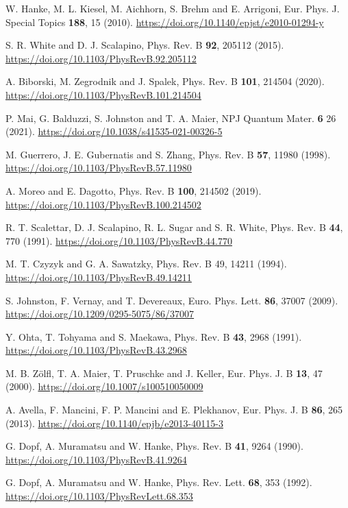 \documentclass[reprint,nofootinbib,nobibnotes,amsmath,amssymb,aps,prb,floatfix]{revtex4-1}
\begin{document}
\begin{thebibliography}{99}
 W. Hanke, M. L. Kiesel, M. Aichhorn, S. Brehm and E. Arrigoni, Eur. Phys. J. Special Topics {\bf 188}, 15 (2010). \url{https://doi.org/10.1140/epjst/e2010-01294-y}

S. R. White and D. J. Scalapino, Phys. Rev. B {\bf 92}, 205112 (2015).  \url{https://doi.org/10.1103/PhysRevB.92.205112}

 A. Biborski, M. Zegrodnik and J. Spalek, Phys. Rev. B {\bf 101}, 214504 (2020). \url{https://doi.org/10.1103/PhysRevB.101.214504}

 P. Mai, G. Balduzzi, S. Johnston and T. A. Maier, NPJ Quantum Mater. {\bf 6} 26 (2021). \url{https://doi.org/10.1038/s41535-021-00326-5}

 M. Guerrero, J. E. Gubernatis and S. Zhang, Phys. Rev. B {\bf 57}, 11980 (1998). \url{https://doi.org/10.1103/PhysRevB.57.11980}

  A. Moreo and E. Dagotto, Phys. Rev. B {\bf 100}, 214502 (2019). \url{https://doi.org/10.1103/PhysRevB.100.214502}

 R. T. Scalettar, D. J. Scalapino, R. L. Sugar and S. R. White, Phys. Rev. B {\bf 44}, 770 (1991). \url{https://doi.org/10.1103/PhysRevB.44.770}

 M. T. Czyzyk and G. A. Sawatzky, Phys. Rev. B 49, 14211 (1994). \url{https://doi.org/10.1103/PhysRevB.49.14211}

 S. Johnston, F. Vernay, and T. Devereaux, Euro. Phys. Lett. {\bf 86}, 37007 (2009). \url{https://doi.org/10.1209/0295-5075/86/37007}

 Y. Ohta, T. Tohyama and S. Maekawa,  Phys. Rev. B {\bf 43}, 2968 (1991). \url{https://doi.org/10.1103/PhysRevB.43.2968}

 M. B. Z\"{o}lfl, T. A. Maier, T. Pruschke and J. Keller, Eur. Phys. J. B {\bf 13}, 47 (2000). \url{https://doi.org/10.1007/s100510050009}

 A. Avella, F. Mancini, F. P. Mancini and E. Plekhanov, Eur. Phys. J. B {\bf 86}, 265 (2013). \url{https://doi.org/10.1140/epjb/e2013-40115-3}

 G. Dopf, A. Muramatsu and W. Hanke, Phys. Rev. B {\bf 41}, 9264 (1990). \url{https://doi.org/10.1103/PhysRevB.41.9264}

 G. Dopf, A. Muramatsu and W. Hanke, Phys. Rev. Lett. {\bf 68}, 353 (1992). \url{https://doi.org/10.1103/PhysRevLett.68.353}


\end{thebibliography}
\end{document}

